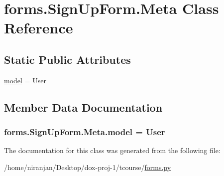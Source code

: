 \hypertarget{classforms_1_1_sign_up_form_1_1_meta}{}\section{forms.\+Sign\+Up\+Form.\+Meta Class Reference}
\label{classforms_1_1_sign_up_form_1_1_meta}
\subsection*{Static Public Attributes}
\begin{DoxyCompactItemize}
\item 
\hyperlink{classforms_1_1_sign_up_form_1_1_meta_ab5a0fb25e8d15956de9d603405ce6d3b}{model} = User
\end{DoxyCompactItemize}


\subsection{Member Data Documentation}
\subsubsection[{\texorpdfstring{model}{model}}]{\setlength{\rightskip}{0pt plus 5cm}forms.\+Sign\+Up\+Form.\+Meta.\+model = User\hspace{0.3cm}{\ttfamily [static]}}\hypertarget{classforms_1_1_sign_up_form_1_1_meta_ab5a0fb25e8d15956de9d603405ce6d3b}{}\label{classforms_1_1_sign_up_form_1_1_meta_ab5a0fb25e8d15956de9d603405ce6d3b}


The documentation for this class was generated from the following file\+:\begin{DoxyCompactItemize}
\item 
/home/niranjan/\+Desktop/dox-\/proj-\/1/tcourse/\hyperlink{forms_8py}{forms.\+py}\end{DoxyCompactItemize}
